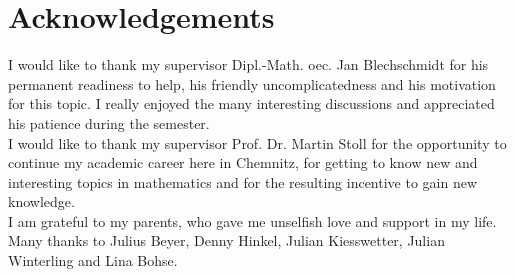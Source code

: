 \chapter*{Acknowledgements}

I would like to thank my supervisor Dipl.-Math. oec. Jan Blechschmidt for his permanent readiness to help, his friendly uncomplicatedness and his motivation for this topic. I really enjoyed the many interesting discussions and appreciated his patience during the semester. \\
I would like to thank my supervisor Prof. Dr. Martin Stoll for the opportunity to continue my academic career here in Chemnitz, for getting to know new and interesting topics in mathematics and for the resulting incentive to gain new knowledge. \\
I am grateful to my parents, who gave me unselfish love and support in my life. Many thanks to Julius Beyer, Denny Hinkel, Julian Kiesswetter, Julian Winterling and Lina Bohse. 